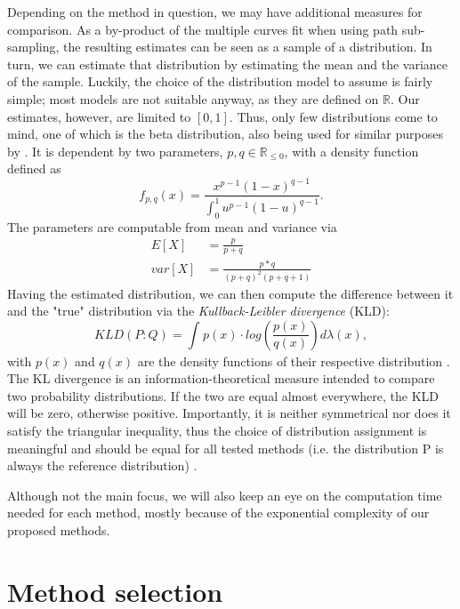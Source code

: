 Depending on the method in question, we may have additional measures for comparison. As a by-product of the multiple curves fit when using path sub-sampling, the resulting estimates can be seen as a sample of a distribution. In turn, we can estimate that distribution by estimating the mean and the variance of the sample. Luckily, the choice of the distribution model to assume is fairly simple; most models are not suitable anyway, as they are defined on $\mathbb{R}$. Our estimates, however, are limited to $[0,1]$. Thus, only few distributions come to mind, one of which is the beta distribution, also being used for similar purposes by \cite{KremplEtAl2014}. It is dependent by two parameters, $p, q \in \mathbb{R}_{\le 0}$, with a density function defined as \cite{GuptaEtAl2004}
\begin{equation}
f_{p, q}(x) = \frac{x^{p-1}(1-x)^{q-1}}{\int_{0}^{1} u^{p-1}(1-u)^{q-1}}.
\end{equation}
The parameters are computable from mean and variance via
\begin{equation}
\begin{split}
E[X] &= \frac{p}{p+q} \\
var[X] &= \frac{p*q}{(p+q)^2(p+q+1)}
\end{split}
\end{equation}
Having the estimated distribution, we can then compute the difference between it and the "true" distribution via the \textit{Kullback-Leibler divergence} (KLD):
\begin{equation}
KLD(P:Q) = \int_{}^{} p(x) \cdot log\left(\frac{p(x)}{q(x)}\right) d\lambda (x),
\end{equation}
with $p(x)$ and $q(x)$ are the density functions of their respective distribution \cite{KullbackEtAl1951}. The KL divergence is an information-theoretical measure intended to compare two probability distributions. If the two are equal almost everywhere, the KLD will be zero, otherwise positive. Importantly, it is neither symmetrical nor does it satisfy the triangular inequality, thus the choice of distribution assignment is meaningful and should be equal for all tested methods (i.e. the distribution P is always the reference distribution) \cite{Joyce2011}.

Although not the main focus, we will also keep an eye on the computation time needed for each method, mostly because of the exponential complexity of our proposed methods.

\section{Method selection}

